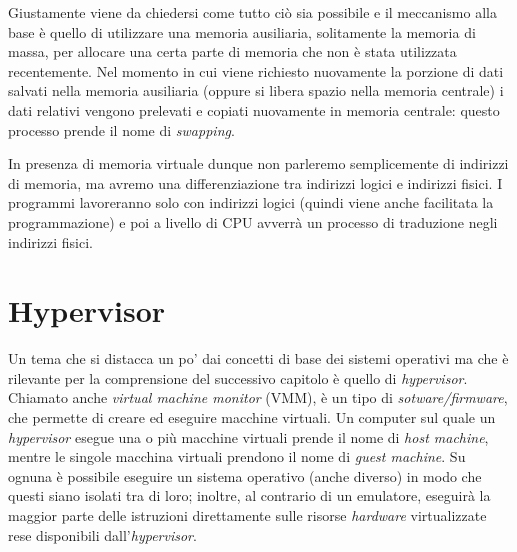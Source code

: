 Giustamente viene da chiedersi come tutto ciò sia possibile e il meccanismo alla base è quello di utilizzare una memoria ausiliaria, solitamente la memoria di massa, per allocare una certa parte di memoria che non è stata utilizzata recentemente. Nel momento in cui viene richiesto nuovamente la porzione di dati salvati nella memoria ausiliaria (oppure si libera spazio nella memoria centrale) i dati relativi vengono prelevati e copiati nuovamente in memoria centrale: questo processo prende il nome di \textit{swapping}. 

In presenza di memoria virtuale dunque non parleremo semplicemente di indirizzi di memoria, ma avremo una differenziazione tra indirizzi logici e indirizzi fisici. I programmi lavoreranno solo con indirizzi logici (quindi viene anche facilitata la programmazione) e poi a livello di CPU avverrà un processo di traduzione negli indirizzi fisici.

\section{Hypervisor}
Un tema che si distacca un po' dai concetti di base dei sistemi operativi ma che è rilevante per la comprensione del successivo capitolo è quello di \textit{hypervisor}. Chiamato anche \textit{virtual machine monitor} (VMM), è un tipo di \textit{sotware/firmware}, che permette di creare ed eseguire macchine virtuali. Un computer sul quale un \textit{hypervisor} esegue una o più macchine virtuali prende il nome di \textit{host machine}, mentre le singole macchina virtuali prendono il nome di \textit{guest machine}. Su ognuna è possibile eseguire un sistema operativo (anche diverso) in modo che questi siano isolati tra di loro; inoltre, al contrario di un emulatore, eseguirà la maggior parte delle istruzioni direttamente sulle risorse \textit{hardware} virtualizzate rese disponibili dall'\textit{hypervisor}.